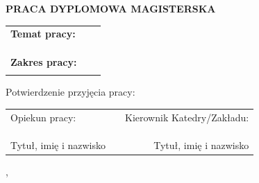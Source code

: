 {  \begin{center}
    \vspace{1cm}
    \LARGE{\textbf{\uppercase{Praca dyplomowa magisterska}}}
  \end{center}
  \vspace{1cm}
	
	\large{
		\begin{tabular}{@{}llr@{}}
			\textbf{Temat pracy:} \\ \@title\\
			\\
			
			\\
			\textbf{Zakres pracy:} \\ \@descr\\
		\end{tabular}
		
		\vspace{2.5cm}
		Potwierdzenie przyjęcia pracy:
		\vspace{1cm}
		
		\begin{tabular}{@{}lp{5cm}r@{}}
			Opiekun pracy: & & Kierownik Katedry/Zakładu: \\ \\ \\ \\
			Tytuł, imię i nazwisko & & Tytuł, imię i nazwisko
		\end{tabular}
		
		\begin{center}
			\@miasto, \@date
		\end{center}
	}
	
}

\makeatother

\cleardoublepage